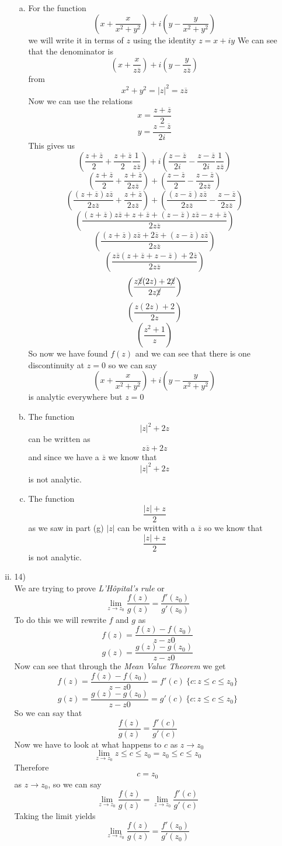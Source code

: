 \documentclass[11pt]{article}
\newcommand{\zbar}{\overline{z}}
\begin{document}
\begin{enumerate}
\begin{enumerate}[(i)]
\begin{enumerate}[(a)]
\item
For the function
$$\left(x+\frac{x}{x^2+y^2}\right)+i\left(y-\frac{y}{x^2+y^2}\right)$$
we will write it in terms of $z$ using the identity $z = x+iy$
We can see that the denominator is 
$$\left(x+\frac{x}{z\zbar}\right)+i\left(y-\frac{y}{z\zbar}\right)$$
from 
$$x^2+y^2 = |z|^2 = z\zbar$$
Now we can use the relations 
$$x=\frac{z+\zbar}{2}$$
$$y=\frac{z-\zbar}{2i}$$
This gives us 
$$\left(\frac{z+\zbar}{2}+\frac{z+\zbar}{2}\frac{1}{z\zbar}\right)+i\left(\frac{z-\zbar}{2i}-\frac{z-\zbar}{2i}\frac{1}{z\zbar}\right)$$
$$\left(\frac{z+\zbar}{2}+\frac{z+\zbar}{2z\zbar}\right)+\left(\frac{z-\zbar}{2}-\frac{z-\zbar}{2z\zbar}\right)$$
$$\left(\frac{(z+\zbar)z\zbar}{2z\zbar}+\frac{z+\zbar}{2z\zbar}\right)+\left(\frac{(z-\zbar)z\zbar}{2z\zbar}-\frac{z-\zbar}{2z\zbar}\right)$$
$$\left(\frac{(z+\zbar)z\zbar + z+\zbar + (z-\zbar)z\zbar-z+\zbar}{2z\zbar}\right)$$
$$\left(\frac{(z+\zbar)z\zbar +2\zbar + (z-\zbar)z\zbar}{2z\zbar}\right)$$
$$\left(\frac{z\zbar(z+\zbar+z-\zbar) +2\zbar}{2z\zbar}\right)$$
$$\left(\frac{z\cancel{\zbar}(2z) +2\cancel{\zbar}}{2z\cancel{\zbar}}\right)$$
$$\left(\frac{z(2z) +2}{2z}\right)$$
$$\left(\frac{z^2 +1}{z}\right)$$
So now we have found $f(z)$ and we can see that there is one discontinuity at $z=0$ so we can say 
$$\left(x+\frac{x}{x^2+y^2}\right)+i\left(y-\frac{y}{x^2+y^2}\right)$$
is analytic everywhere but $z=0$

\item
The function $$|z|^2 +2z$$
can be written as
$$z\zbar +2z$$ and since we have a $\zbar$ we know that
$$|z|^2 +2z$$ is not analytic.
\item
The function 
$$\frac{|z| + z}{2}$$
as we saw in part (g) $|z|$ can be written with a $\zbar$ so we know that 
$$\frac{|z| + z}{2}$$
is not analytic.
\end{enumerate}

\item 14)\\
We are trying to prove \emph{L'H\^opital's rule} or
$$\lim_{z\rightarrow z_0} \frac{f(z)}{g(z)}= \frac{f'(z_0)}{g'(z_0)}$$
To do this we will rewrite $f$ and $g$ as
$$f(z) = \frac{f(z) - f(z_0)}{z-z0}$$
$$g(z) = \frac{g(z) - g(z_0)}{z-z0}$$
Now can see that through the \emph{Mean Value Theorem} we get
$$f(z) = \frac{f(z) - f(z_0)}{z-z0} = f'(c)\ \{c: z\le c\le z_0\}$$
$$g(z) = \frac{g(z) - g(z_0)}{z-z0} = g'(c)\ \{c: z\le c\le z_0\}$$
So we can say that
$$\frac{f(z)}{g(z)}= \frac{f'(c)}{g'(c)}$$
Now we have to look at what happens to $c$ as $z\rightarrow z_0$
$$\lim_{z\rightarrow z_0} z\le c\le z_0 = z_0\le c\le z_0$$
Therefore
$$c=z_0$$
as $z \rightarrow z_0$, so we can say
$$\lim_{z\rightarrow z_0} \frac{f(z)}{g(z)}= \lim_{z\rightarrow z_0}\frac{f'(c)}{g'(c)}$$
Taking the limit yields
$$\lim_{z\rightarrow z_0} \frac{f(z)}{g(z)}= \frac{f'(z_0)}{g'(z_0)}$$


\end{enumerate}
\end{enumerate}
\end{document}

